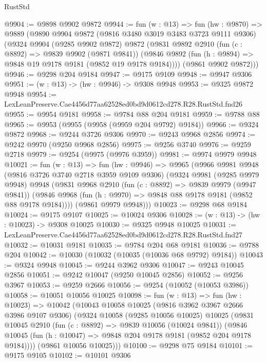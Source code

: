 \begin{lexlean}{RustStd}
\begin{coremodule}
@9904 := @9898 @9902 @9872
@9944 := fun (w : @13) =>
  fun (hw : @9870) =>
  @9889
    (@9890
      @9904
      @9872
      (@9816 @3480 @3019 @3483 @3723 @9111 @9306)
      (@9324
        @9904
        (@9285 @9902 @9872)
        @9872
        (@9831
          @9892
          @2910
          (fun (c : @8892) => @9839 @9902 (@9871 @9841))
          (@9846 @9892 (fun (h : @9894) => @9848 @19 @9178 @9181 (@9852 @19 @9178 @9184))))
        (@9861 @9902 @9872)))
@9946 := @9298 @204 @9184
@9947 := @9175 @9109
@9948 := @9947 @9306
@9951 := (w : @13) -> (hw : @9946) -> @9308 @9948
@9953 := @9325 @9872 @9948
@9954 := LexLeanPreserve.Cae4456d77aa62528ed0bd9d0612cd278.R28.RustStd.fnd26
@9955 := @9954 @9181
@9958 := @9784 @88 @204 @9181
@9959 := @9788 @88
@9965 := @9953 (@9955 (@9958 (@9959 @204 @9792) @9184))
@9966 := @9324 @9872
@9968 := @9244 @3726 @9306
@9970 := @9243 @9968 @2856
@9974 := @9242 @9970 (@9250 @9968 @2856)
@9975 := @9256 @3740
@9976 := @9259 @2718
@9979 := @9254 (@9975 (@9976 @3959))
@9981 := @9974 @9979 @9948
@10021 := fun (w : @13) =>
  fun (hw : @9946) =>
  @9965
    (@9966
      @9981
      @9948
      (@9816 @3726 @3740 @2718 @3959 @9109 @9306)
      (@9324
        @9981
        (@9285 @9979 @9948)
        @9948
        (@9831
          @9968
          @2910
          (fun (c : @8892) => @9839 @9979 (@9947 @9841))
          (@9846 @9968 (fun (h : @9970) => @9848 @88 @9178 @9181 (@9852 @88 @9178 @9184))))
        (@9861 @9979 @9948)))
@10023 := @9298 @68 @9184
@10024 := @9175 @9107
@10025 := @10024 @9306
@10028 := (w : @13) -> (hw : @10023) -> @9308 @10025
@10030 := @9325 @9948 @10025
@10031 := LexLeanPreserve.Cae4456d77aa62528ed0bd9d0612cd278.R28.RustStd.fnd27
@10032 := @10031 @9181
@10035 := @9784 @204 @68 @9181
@10036 := @9788 @204
@10042 := @10030 (@10032 (@10035 (@10036 @68 @9792) @9184))
@10043 := @9324 @9948
@10045 := @9244 @3962 @9306
@10047 := @9243 @10045 @2856
@10051 := @9242 @10047 (@9250 @10045 @2856)
@10052 := @9256 @3967
@10053 := @9259 @2666
@10056 := @9254 (@10052 (@10053 @3986))
@10058 := @10051 @10056 @10025
@10098 := fun (w : @13) =>
  fun (hw : @10023) =>
  @10042
    (@10043
      @10058
      @10025
      (@9816 @3962 @3967 @2666 @3986 @9107 @9306)
      (@9324
        @10058
        (@9285 @10056 @10025)
        @10025
        (@9831
          @10045
          @2910
          (fun (c : @8892) => @9839 @10056 (@10024 @9841))
          (@9846 @10045 (fun (h : @10047) => @9848 @204 @9178 @9181 (@9852 @204 @9178 @9184))))
        (@9861 @10056 @10025)))
@10100 := @9298 @75 @9184
@10101 := @9175 @9105
@10102 := @10101 @9306

\end{coremodule}
\end{lexlean}
